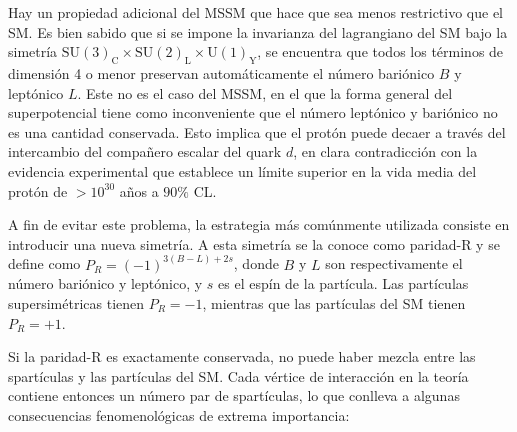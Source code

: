 


Hay un propiedad adicional del MSSM que hace que sea menos restrictivo que el SM.
Es bien sabido que si se impone la invarianza del lagrangiano del SM bajo la
simetría $ \text{SU}(3)_\text{C} \times \text{SU}(2)_\text{L} \times \text{U}(1)_\text{Y}$, se
encuentra que todos los términos de dimensión 4 o menor preservan
automáticamente el número bariónico $B$ y leptónico $L$. Este no es el caso del
MSSM, en el que la forma general del superpotencial tiene como inconveniente que
el número leptónico y bariónico no es una cantidad conservada. Esto implica que
el protón puede decaer a través del intercambio del compañero escalar del quark
$d$, en clara contradicción con la evidencia experimental que establece
un límite superior en la vida media del protón de $> 10^{30}$ a\~nos a
$90\%$ CL\cite{PDG}.

A fin de evitar este problema, la estrategia más comúnmente utilizada consiste en introducir
una nueva simetría. A esta simetría se la conoce como paridad-R y se define
como $P_R = (-1)^{3(B-L)+ 2s}$,
donde $B$ y $L$ son respectivamente el número bariónico y leptónico, y $s$ es el
espín de la partícula. Las partículas supersimétricas tienen $P_R = -1$, mientras
que las partículas del SM tienen $P_R = +1$.

Si la paridad-R es exactamente conservada, no puede haber mezcla entre las
spartículas y las partículas del SM. Cada vértice de interacción en la teoría
contiene entonces un número par de spartículas, lo que conlleva a algunas
consecuencias fenomenológicas de extrema importancia:

